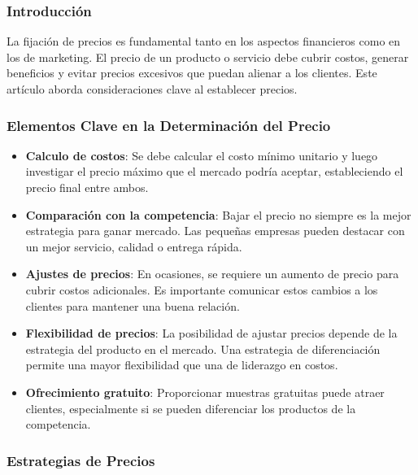 \documentclass{templateNote}
\begin{document}
\subsubsection*{Introducción}
La fijación de precios es fundamental tanto en los aspectos financieros como en los de marketing. El precio de un producto o servicio debe cubrir costos, generar beneficios y evitar precios excesivos que puedan alienar a los clientes. Este artículo aborda consideraciones clave al establecer precios.

\subsubsection*{Elementos Clave en la Determinación del Precio}

\begin{itemize}
    \item \textbf{Calculo de costos}: Se debe calcular el costo mínimo unitario y luego investigar el precio máximo que el mercado podría aceptar, estableciendo el precio final entre ambos.
    \item \textbf{Comparación con la competencia}: Bajar el precio no siempre es la mejor estrategia para ganar mercado. Las pequeñas empresas pueden destacar con un mejor servicio, calidad o entrega rápida.
    \item \textbf{Ajustes de precios}: En ocasiones, se requiere un aumento de precio para cubrir costos adicionales. Es importante comunicar estos cambios a los clientes para mantener una buena relación.
    \item \textbf{Flexibilidad de precios}: La posibilidad de ajustar precios depende de la estrategia del producto en el mercado. Una estrategia de diferenciación permite una mayor flexibilidad que una de liderazgo en costos.
    \item \textbf{Ofrecimiento gratuito}: Proporcionar muestras gratuitas puede atraer clientes, especialmente si se pueden diferenciar los productos de la competencia.
\end{itemize}

\subsubsection*{Estrategias de Precios}
\end{document}
